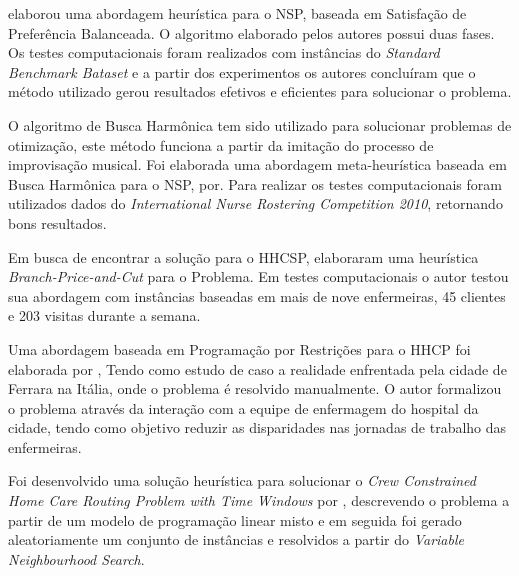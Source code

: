 \cite{constantino:2011} elaborou uma abordagem heurística para o \ac{NSP}, baseada em Satisfação de Preferência Balanceada. O algoritmo elaborado pelos autores possui duas fases. Os testes computacionais foram realizados com instâncias do \textit{Standard Benchmark Bataset} e a partir dos experimentos os autores concluíram que o método utilizado gerou resultados efetivos e eficientes para solucionar o problema.

O algoritmo de Busca Harmônica  tem sido utilizado para solucionar problemas de otimização, este método funciona a partir da imitação do processo de improvisação musical.  Foi elaborada uma abordagem meta-heurística baseada em Busca Harmônica para o \ac{NSP}, por\cite{awadallah:2011}. Para realizar os testes computacionais foram utilizados dados do \textit{ International Nurse Rostering Competition 2010}, retornando bons resultados.






Em busca de encontrar a solução para o \ac{HHCSP}, \cite{trautsamwieser:2014} elaboraram uma heurística  \textit{Branch-Price-and-Cut} para o Problema. Em testes computacionais o autor testou sua abordagem com instâncias baseadas em mais de nove enfermeiras, 45 clientes e 203 visitas durante a semana.

Uma abordagem baseada em Programação por Restrições para o \ac{HHCP} foi elaborada por \cite{cattafi:2012}, Tendo como estudo de caso a realidade enfrentada pela cidade de Ferrara na Itália, onde o problema é resolvido manualmente. O autor formalizou o problema através da interação com a equipe de enfermagem do hospital da cidade, tendo como objetivo reduzir as disparidades nas jornadas de trabalho das enfermeiras.

Foi desenvolvido uma solução heurística para solucionar o \textit{Crew Constrained Home Care Routing Problem with Time Windows} por \cite{tozlu:2016}, descrevendo o problema a partir de um modelo de programação linear misto e em seguida foi gerado aleatoriamente um conjunto de instâncias e resolvidos a partir do \textit{Variable Neighbourhood Search}. 


